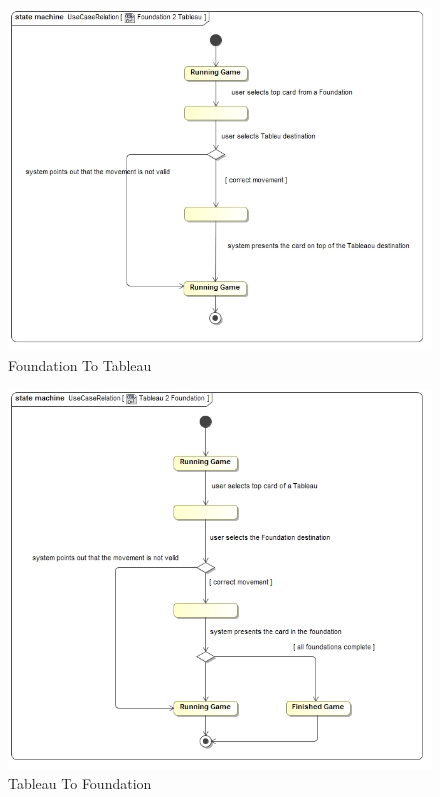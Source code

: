 \documentclass[11pt]{article}
\begin{document}
\begin{center}
 \begin{figure}[H]
 \begin{center}
   \includegraphics[width=14cm]{DomainModel/Foundation2Tableau.jpg}
   \caption{Foundation To Tableau}
   \label{fig:foundation2tableau}
 \end{center}
 \end{figure}
\end{center}

\begin{center}
 \begin{figure}[H]
 \begin{center}
   \includegraphics[width=14cm]{DomainModel/Tableau2Foundation.jpg}
   \caption{Tableau To Foundation}
   \label{fig:tableau2foundation}
 \end{center}
 \end{figure}
\end{center}
\end{document}
